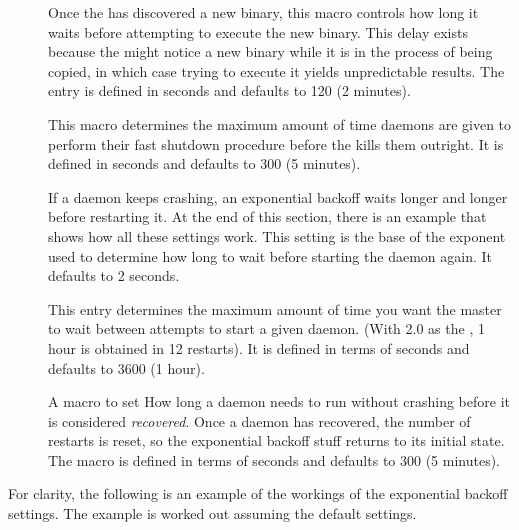\begin{description}
\item[]
  \label{param:MasterNewBinaryDelay} Once the  has
  discovered a new binary, this macro controls how long it waits
  before attempting to execute the new binary.  This delay exists
  because the  might notice a new binary while it
  is in the process of being copied,
  in which case trying to execute it yields
  unpredictable results.  The entry is defined in seconds and
  defaults to 120 (2 minutes).

\item[]
  \label{param:ShutdownFastTimeout} This macro determines the maximum
  amount of time daemons are given to perform their
  fast shutdown procedure before the  kills them
  outright.  It is defined in seconds and defaults to 300 (5 minutes).

\item[]
  \label{param:MasterBackoffFactor} If a daemon keeps crashing, an
  exponential backoff waits longer and longer before
  restarting it.  At the end of this section, there is an example that
  shows how all these settings work.  This setting is the base of the
  exponent used to determine how long to wait before starting the
  daemon again.  It defaults to 2 seconds.

\item[]
  \label{param:MasterBackoffCeiling} This entry determines the maximum
  amount of time you want the master to wait between attempts to start
  a given daemon.  (With 2.0 as the ,
  1 hour is obtained in 12 restarts).  It is defined in terms of
  seconds and defaults to 3600 (1 hour).

\item[]
  \label{param:MasterRecoverFactor}  A macro to set How long a daemon 
  needs to run without crashing before it is considered \emph{recovered}.
  Once a
  daemon has recovered, the number of restarts is reset, so the
  exponential backoff stuff returns to its initial state.  
  The macro is defined in
  terms of seconds and defaults to 300 (5 minutes).

\end{description}

For clarity, the following is an example of the workings of
the exponential backoff settings.  The example is worked out assuming
the default settings.

